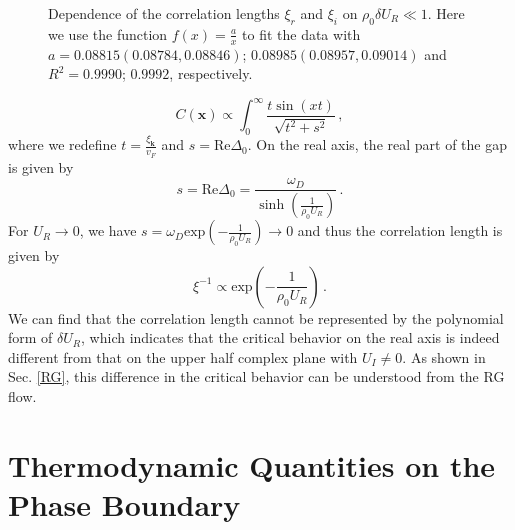\documentclass[aps,prl,twocolumn,superscriptaddress]{revtex4-1}
\begin{document}
\begin{bibunit}
\begin{figure}
	\caption{Dependence of the correlation lengths $\xi_r$ and $\xi_i$ on $\rho_{0}\delta U_{R}\ll1$. Here we use the function $f(x)=\frac{a}{x}$ to fit the data with
		$a=0.08815(0.08784,0.08846)$; $0.08985(0.08957,0.09014)$ and $R^{2}=0.9990$;
		$0.9992$, respectively.}
	\label{fig3}
\end{figure}
\begin{equation}
	C(\bm{x})\propto\int_0^{\infty}\frac{t\sin(xt)}{\sqrt{t^2+s^2}}\,,
\end{equation}
where we redefine $t=\frac{\xi_{\bm{k}}}{v_F}$ and $s=\text{Re}\Delta_0$. On the real axis, the real part of the gap is given by
\begin{equation}
	s=\text{Re}\Delta_0=\frac{\omega_D}{\sinh(\frac{1}{\rho_0U_R})}\,.
\end{equation}
For $U_R\to0$, we have $s=\omega_D\text{exp}(-\frac{1}{\rho_0U_R})\to0$ and thus the correlation length is given by
\begin{equation}
	\xi^{-1}\propto\text{exp}(-\frac{1}{\rho_0 U_R})\,.
\end{equation}
We can find that the correlation length cannot be represented by the polynomial form of $\delta U_R$, which indicates that the critical behavior on the real axis is indeed different from that on the upper half complex plane with $U_I\neq0$. As shown in Sec. \ref{RG}, this difference in the critical behavior can be understood from the RG flow.


\section{Thermodynamic Quantities on the Phase Boundary}


\end{bibunit}
\end{document}
